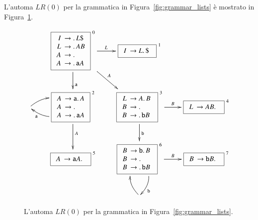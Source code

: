 L'automa $\mathit{LR}(0)$
per la grammatica in Figura~\ref{fig:grammar_lists} \`e
mostrato in Figura~\ref{fig:lr0_lists_automaton}.
%
\begin{figure}[t]
\[
\xymatrix{
  &
  \fbox{$
  \begin{array}{rl}
     I \!\!\!& \to\idot L\mathtt{\$}\\
     L \!\!\!& \to\idot AB\\
     A \!\!\!& \to\idot\\
     A \!\!\!& \to\idot\mathtt{a}A
  \end{array}$}^{\ 0}
  \ar[r]^L\ar[d]^(.6){\mathtt{a}}\ar[rd]^A
  &
  \fbox{$
  \begin{array}{rl}
     I \!\!\!& \to L\idot\mathtt{\$}
  \end{array}$
  }^{\ 1}\\
  {}\ar@/^3ex/[r]
  &
   \fbox{$
  \begin{array}{rl}
     A \!\!\!& \to\mathtt{a}\idot A\\
     A \!\!\!& \to\idot\\
     A \!\!\!& \to\idot\mathtt{a}A
  \end{array}$}^{\ 2}\ar[d]^A
  \ar@/^3ex/[l]^(.8){\mathtt{a}}
  &
  \fbox{$
  \begin{array}{rl}
     L \!\!\!& \to A\idot B\\
     B \!\!\!& \to\idot\\
     B \!\!\!& \to\idot\mathtt{b}B
  \end{array}$
  }^{\ 3}
  \ar[r]^B\ar[d]^{\mathtt{b}}
  &
  \fbox{$
  \begin{array}{rl}
     L \!\!\!& \to AB\idot
  \end{array}$
  }^{\ 4}\\
  &
  \fbox{$
  \begin{array}{rl}
     A \!\!\!& \to\mathtt{a}A\idot
  \end{array}$
  }^{\ 5}
  &
  \fbox{$
  \begin{array}{rl}
     B \!\!\!& \to\mathtt{b}\idot B\\
     B \!\!\!& \to\idot\\
     B \!\!\!& \to\idot\mathtt{b}B
  \end{array}$
  }^{\ 6}
  \ar[r]^B
  \ar@/^3ex/[d]^(.8){\mathtt{b}}
  &
  \fbox{$
  \begin{array}{rl}
     B \!\!\!& \to\mathtt{b}B\idot
  \end{array}$
  }^{\ 7}\\
  & & {}\ar@/^3ex/[u] &
}
\]
\caption{L'automa $\mathit{LR}(0)$ per la grammatica in
         Figura~\ref{fig:grammar_lists}.}\label{fig:lr0_lists_automaton}
\end{figure}
